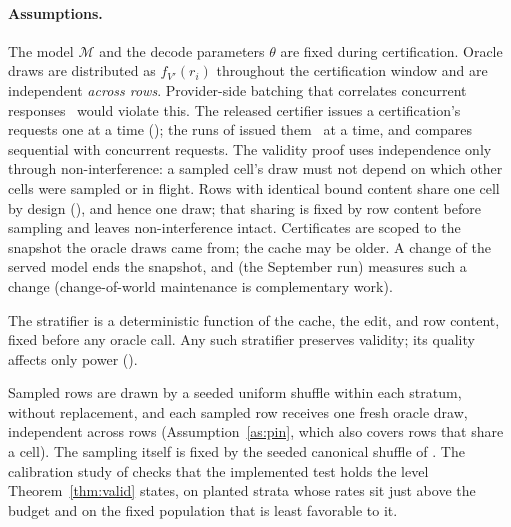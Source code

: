 \paragraph{Assumptions.}
\begin{assumption}\label{as:pin}
The model $\mathcal{M}$ and the decode parameters $\theta$ are fixed
during certification. Oracle draws are
distributed as $f_{V'}(r_i)$ throughout the certification window and
are independent \emph{across rows}. Provider-side batching that
correlates concurrent responses~\cite{yuan,tml} would violate this. The
released certifier issues a certification's requests one at a time
(); the runs of  issued them
\deployConcurrency\ at a time\ifnum{}\relax, and
 compares sequential with concurrent
requests\fi. The validity proof uses independence only through
non-interference: a sampled cell's draw must not depend on which other
cells were sampled or in flight. Rows with identical bound content
share one cell by design (), and hence one draw; that
sharing is fixed by row content before sampling and leaves
non-interference intact. Certificates are scoped
to the snapshot the oracle draws came from; the cache may be older. A
change of the served model ends the snapshot, and 
(the September run) measures such a change
(change-of-world maintenance is complementary work).
\end{assumption}
\begin{assumption}\label{as:frozen}
The stratifier is a deterministic function of the cache, the edit, and
row content, fixed before any oracle call. Any such stratifier
preserves validity; its quality affects only power
().
\end{assumption}
\begin{assumption}\label{as:sample}
Sampled rows are drawn by a seeded uniform shuffle within each stratum,
without replacement, and each sampled row receives one fresh oracle
draw, independent across rows (Assumption~\ref{as:pin}, which also
covers rows that share a cell). The sampling
itself is fixed by the seeded canonical shuffle of .
The calibration study of  checks that the
implemented test holds the level Theorem~\ref{thm:valid} states, on
planted strata whose rates sit just above the budget and on the fixed
population that is least favorable to it.
\end{assumption}

